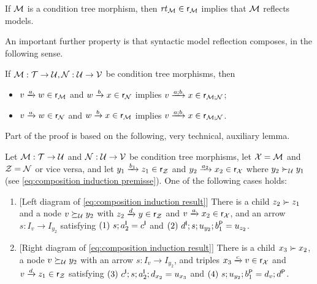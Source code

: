 \begin{corollary}
If ${\mathcal{M}}$ is a condition tree morphism, then $\mathit{rt}_{{\mathcal{M}}}\in {\mathsf{r}}_{\mathcal{M}}$ implies that ${\mathcal{M}}$ reflects models.
\end{corollary}
%
An important further property is that syntactic model reflection composes, in the following sense.
%
\begin{proposition}\label{prop:syntactic reflection composes}
If ${\mathcal{M}}:{\mathcal{T}}\rightarrow{\mathcal{U}},{\mathcal{N}}:{\mathcal{U}}\rightarrow {\mathcal{V}}$ be condition tree morphisms, then
\begin{itemize}
\item $\trip vaw\in \rgen_\cM$ and $\trip wbx\in \rgen_\cN$ implies $\trip v{a;b}x\in \rgen_{\cM;\cN}$;
\item $\trip vaw\in \rgen_\cN$ and $\trip wbx\in \rgen_\cM$ implies $\trip v{a;b}x\in \rgen_{\cM;\cN}$.
\end{itemize}
\end{proposition}
%
Part of the proof is based on the following, very technical, auxiliary lemma.
%
\begin{lemma}\label{lem:composition induction}
Let ${\mathcal{M}}:{\mathcal{T}}\rightarrow{\mathcal{U}}$ and ${\mathcal{N}}:{\mathcal{U}}\rightarrow {\mathcal{V}}$ be condition tree morphisms, let ${\mathcal{X}}={\mathcal{M}}$ and ${\mathcal{Z}}={\mathcal{N}}$ or vice versa, and let $\trip{y_1}{b_1}{z_1}\in \rgen_\cZ$ and $\trip{y_2}{a_2}{x_2}\in \rgen_\cX$ where $y_2\childof_\cU y_1$ (see \eqref{eq:composition induction premisse}). One of the following cases holds:
\begin{enumerate}
\item {[Left diagram of \eqref{eq:composition induction result}]} There is a child $z_2\childof z_1$ and a node $v\succeq_{\mathcal{U}} y_2$ with $\trip {z_2}dy\in\rgen_\cZ$ and $\trip va{x_2}\in \rgen_\cX$, and an arrow $s:I_v\to I_{y_2}$ satisfying $\inlab{A1} s;a\I_2=c\I$ and $\inlab{A2} d\I;s;u_{y_2};b\P_1=u_{z_2}$.

\item {[Right diagram of \eqref{eq:composition induction result}]}  There is a child $x_3\childof x_2$, a node $v\succeq_{\mathcal{U}} y_2$ with an arrow $s:I_v\to I_{y_2}$, and triples $\trip{x_3}cv\in \rgen_\cX$ and $\trip vd{z_1}\in \rgen_\cZ$ satisfying $\inlab{B1} c\I;s;a\I_2;d_{x_2}=u_{x_3}$ and $\inlab{B2} s;u_{y_2};b\P_1=d_v;d\P$.
\end{enumerate}
\end{lemma}
